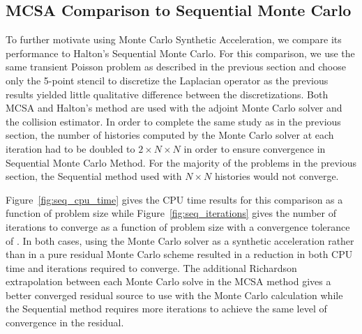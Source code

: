 \subsection{MCSA Comparison to Sequential Monte Carlo}
\label{subsec:sequential_comparison}
To further motivate using Monte Carlo Synthetic Acceleration, we
compare its performance to Halton's Sequential Monte Carlo. For this
comparison, we use the same transient Poisson problem as described in
the previous section and choose only the 5-point stencil to discretize
the Laplacian operator as the previous results yielded little
qualitative difference between the discretizations. Both MCSA and
Halton's method are used with the adjoint Monte Carlo solver and the
collision estimator. In order to complete the same study as in the
previous section, the number of histories computed by the Monte Carlo
solver at each iteration had to be doubled to $2 \times N \times N$ in
order to ensure convergence in Sequential Monte Carlo Method. For the
majority of the problems in the previous section, the Sequential
method used with $N \times N$ histories would not converge.

Figure~\ref{fig:seq_cpu_time} gives the CPU time results for this
comparison as a function of problem size while
Figure~\ref{fig:seq_iterations} gives the number of iterations to
converge as a function of problem size with a convergence tolerance of
. In both cases, using the Monte Carlo solver as a synthetic
acceleration rather than in a pure residual Monte Carlo scheme
resulted in a reduction in both CPU time and iterations required to
converge. The additional Richardson extrapolation between each Monte
Carlo solve in the MCSA method gives a better converged residual
source to use with the Monte Carlo calculation while the Sequential
method requires more iterations to achieve the same level of
convergence in the residual.

